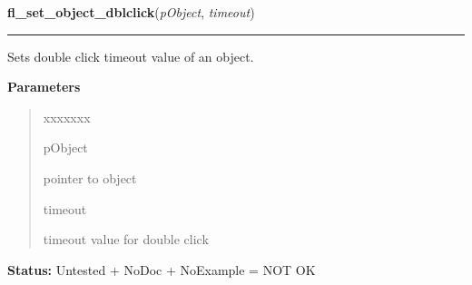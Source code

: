 \hspace{.8\funcindent}\begin{boxedminipage}{\funcwidth}

    \raggedright \textbf{fl\_set\_object\_dblclick}(\textit{pObject}, \textit{timeout})

    \vspace{-1.5ex}

    \rule{\textwidth}{0.5\fboxrule}
\setlength{\parskip}{2ex}
    Sets double click timeout value of an object.

\setlength{\parskip}{1ex}
      \textbf{Parameters}
      \vspace{-1ex}

      \begin{quote}
        \begin{Ventry}{xxxxxxx}

          \item[pObject]

          pointer to object

          \item[timeout]

          timeout value for double click

        \end{Ventry}

      \end{quote}

\textbf{Status:} Untested + NoDoc + NoExample = NOT OK



    \end{boxedminipage}

    \label{xformslib:library:fl_get_object_dblclick}

    \vspace{0.5ex}

